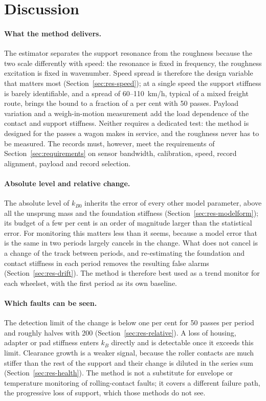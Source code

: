 \section{Discussion}\label{sec:discussion}
\paragraph{What the method delivers.} The estimator separates the support resonance from the roughness
because the two scale differently with speed: the resonance is fixed in frequency, the roughness
excitation is fixed in wavenumber. Speed spread is therefore the design variable that matters most
(Section~\ref{sec:res-speed}); at a single speed the support stiffness is barely identifiable, and a
spread of 60--110~km/h, typical of a mixed freight route, brings the bound to a fraction of a per cent
with 50 passes. Payload variation and a weigh-in-motion measurement add the load dependence of the
contact and support stiffness. Neither requires a dedicated test: the method is designed for the passes a
wagon makes in service, and the roughness never has to be measured. The records must, however, meet the
requirements of Section~\ref{sec:requirements} on sensor bandwidth, calibration, speed, record alignment,
payload and record selection.

\paragraph{Absolute level and relative change.} The absolute level of $k_{B0}$ inherits the error of
every other model parameter, above all the unsprung mass and the foundation stiffness
(Section~\ref{sec:res-modelform}); its budget of a few per cent is an order of magnitude larger than the
statistical error. For monitoring this matters less than it seems, because a model error that is the
same in two periods largely cancels in the change. What does not cancel is a change of the track
between periods, and re-estimating the foundation and contact stiffness in each period removes the
resulting false alarms (Section~\ref{sec:res-drift}). The method is therefore best used as a trend
monitor for each wheelset, with the first period as its own baseline.

\paragraph{Which faults can be seen.} The detection limit of the change is below one per cent for 50
passes per period and roughly halves with 200 (Section~\ref{sec:res-relative}). A loss of housing,
adapter or pad stiffness enters $k_B$ directly and is detectable once it exceeds this limit. Clearance
growth is a weaker signal, because the roller contacts are much stiffer than the rest of the support
and their change is diluted in the series sum (Section~\ref{sec:res-health}). The method is not a
substitute for envelope or temperature monitoring of rolling-contact faults; it covers a different
failure path, the progressive loss of support, which those methods do not see.

